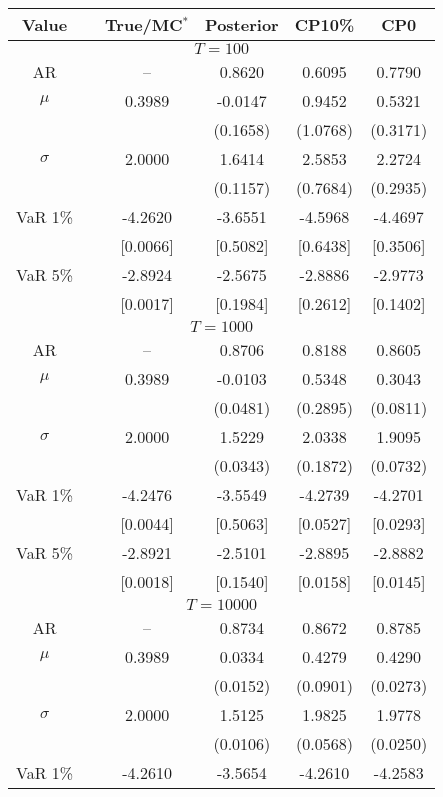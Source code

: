 { \renewcommand{\arraystretch}{1.2} 
\begin{table} 
\center 
\begin{tabular}{cc cccc} 
Value & & True/MC$^*$ & Posterior & CP10\% & CP0 \\ \hline 
\hline 
\multicolumn{6}{c}{$T =100$}  \\ 
\hline 
AR && -- & 0.8620 & 0.6095 & 0.7790  \\  
$\mu$&& 0.3989 & -0.0147 & 0.9452 & 0.5321  \\ 
&&   & (0.1658) & (1.0768) & (0.3171)  \\ 
$\sigma$&& 2.0000 & 1.6414 & 2.5853 & 2.2724  \\ 
&&   & (0.1157) & (0.7684) & (0.2935)  \\ 
VaR 1\% && -4.2620 & -3.6551 & -4.5968 & -4.4697  \\ 
  && [0.0066] & [0.5082] & [0.6438] & [0.3506]  \\ 
VaR 5\% && -2.8924 & -2.5675 & -2.8886 & -2.9773  \\ 
 && [0.0017] & [0.1984] & [0.2612] & [0.1402]  \\ 
\hline 
\multicolumn{6}{c}{$T =1000$}  \\ 
\hline 
AR && -- & 0.8706 & 0.8188 & 0.8605  \\  
$\mu$&& 0.3989 & -0.0103 & 0.5348 & 0.3043  \\ 
&&   & (0.0481) & (0.2895) & (0.0811)  \\ 
$\sigma$&& 2.0000 & 1.5229 & 2.0338 & 1.9095  \\ 
&&   & (0.0343) & (0.1872) & (0.0732)  \\ 
VaR 1\% && -4.2476 & -3.5549 & -4.2739 & -4.2701  \\ 
  && [0.0044] & [0.5063] & [0.0527] & [0.0293]  \\ 
VaR 5\% && -2.8921 & -2.5101 & -2.8895 & -2.8882  \\ 
 && [0.0018] & [0.1540] & [0.0158] & [0.0145]  \\ 
\hline 
\multicolumn{6}{c}{$T =10000$}  \\ 
\hline 
AR && -- & 0.8734 & 0.8672 & 0.8785  \\  
$\mu$&& 0.3989 & 0.0334 & 0.4279 & 0.4290  \\ 
&&   & (0.0152) & (0.0901) & (0.0273)  \\ 
$\sigma$&& 2.0000 & 1.5125 & 1.9825 & 1.9778  \\ 
&&   & (0.0106) & (0.0568) & (0.0250)  \\ 
VaR 1\% && -4.2610 & -3.5654 & -4.2610 & -4.2583  \\ 

\end{tabular}
\end{table}}
